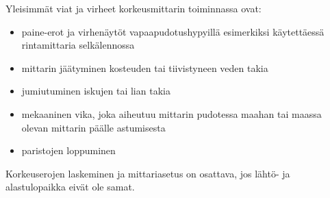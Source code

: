 Yleisimmät viat ja virheet korkeusmittarin toiminnassa ovat: 

\begin{itemize}
\item  paine-erot ja virhenäytöt vapaapudotushypyillä esimerkiksi käytettäessä rintamittaria selkälennossa 
\item  mittarin jäätyminen kosteuden tai tiivistyneen veden takia 
\item  jumiutuminen iskujen tai lian takia 
\item  mekaaninen vika, joka aiheutuu mittarin pudotessa maahan tai maassa olevan mittarin päälle astumisesta 
\item  paristojen loppuminen 
\end{itemize}

Korkeuserojen laskeminen ja mittariasetus on osattava, jos lähtö- ja alastulopaikka eivät ole samat. 


